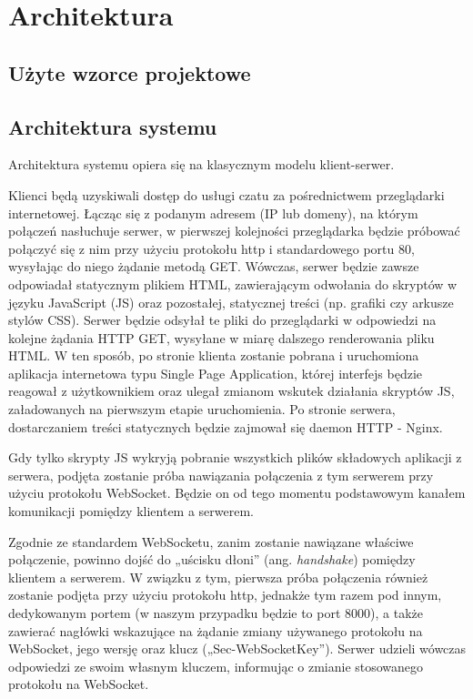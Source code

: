 \section{Architektura}

\subsection{Użyte wzorce projektowe}

\subsection{Architektura systemu}
\label{chat_architektura_systemu}

Architektura systemu opiera się na klasycznym modelu klient-serwer.
 
Klienci będą uzyskiwali dostęp do usługi czatu za pośrednictwem przeglądarki internetowej. Łącząc się z podanym adresem (IP lub domeny), 
na którym połączeń nasłuchuje serwer, w pierwszej kolejności przeglądarka będzie próbować połączyć się z nim przy użyciu protokołu http 
i standardowego portu 80, wysyłając do niego żądanie metodą GET. Wówczas, serwer będzie zawsze odpowiadał statycznym plikiem HTML, zawierającym 
odwołania do skryptów w języku JavaScript (JS) oraz pozostałej, statycznej treści (np. grafiki czy arkusze stylów CSS). Serwer będzie 
odsyłał te pliki do przeglądarki w odpowiedzi na kolejne żądania HTTP GET, wysyłane w miarę dalszego renderowania pliku HTML. W ten sposób, 
po stronie klienta zostanie pobrana i uruchomiona aplikacja internetowa typu Single Page Application, której interfejs będzie reagował z 
użytkownikiem oraz ulegał zmianom wskutek działania skryptów JS, załadowanych na pierwszym etapie uruchomienia. Po stronie serwera, 
dostarczaniem treści statycznych będzie zajmował się daemon HTTP - Nginx.

Gdy tylko skrypty JS wykryją pobranie wszystkich plików składowych aplikacji z serwera, podjęta zostanie próba nawiązania połączenia 
z tym serwerem przy użyciu protokołu WebSocket. Będzie on od tego momentu podstawowym kanałem komunikacji pomiędzy klientem a serwerem. 

Zgodnie ze standardem WebSocketu, zanim zostanie nawiązane właściwe połączenie, powinno dojść do „uścisku dłoni” (ang. \textit{handshake}) pomiędzy 
klientem a serwerem. W związku z tym, pierwsza próba połączenia również zostanie podjęta przy użyciu protokołu http, jednakże tym razem pod
innym, dedykowanym portem (w naszym przypadku będzie to port 8000), a także zawierać nagłówki wskazujące na żądanie zmiany używanego protokołu 
na WebSocket, jego wersję oraz klucz („Sec-WebSocketKey”). Serwer udzieli wówczas odpowiedzi ze swoim własnym kluczem, informując o zmianie 
stosowanego protokołu na WebSocket.

